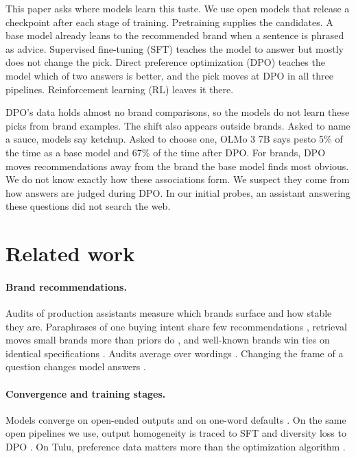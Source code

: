 \documentclass[11pt]{article}
\begin{document}
This paper asks where models learn this taste. We use open models that release a checkpoint after each stage of
training. Pretraining supplies the candidates. A base model already leans to the recommended brand when a sentence is
phrased as advice. Supervised fine-tuning (SFT) teaches the model to answer but mostly does not change the pick. Direct
preference optimization (DPO) teaches the model which of two answers is better, and the pick moves at DPO in all
three pipelines. Reinforcement learning (RL) leaves it there.

DPO's data holds almost no brand comparisons, so the models do not learn these picks from brand examples. The shift
also appears outside brands. Asked to name a sauce, models say ketchup. Asked to choose one, OLMo 3 7B says pesto 5\%
of the time as a base model and 67\% of the time after DPO. For brands, DPO moves recommendations away from the brand
the base model finds most obvious. We do not know exactly how these associations form. We suspect they come from how
answers are judged during DPO. In our initial probes, an assistant answering these questions did not search the web.

\section{Related work}
\label{sec:related}

\paragraph{Brand recommendations.} Audits of production assistants measure which brands surface and how stable they
are. Paraphrases of one buying intent share few recommendations \citep{jack2026paraphrase}, retrieval moves small brands
more than priors do \citep{tannenbaum2026stage}, and well-known brands win ties on identical specifications
\citep{chu2026brands}. Audits average over wordings \citep{zatuchin2026dice}. Changing the frame of a question changes
model answers \citep{trhlik2026multitudes,rabbani2026fact,tonneau2026cues}.

\paragraph{Convergence and training stages.} Models converge on open-ended outputs \citep{jiang2025hivemind} and on
one-word defaults \citep{parikh2026census}. On the same open pipelines we use, output homogeneity is traced to SFT
\citep{fortier2026convergence} and diversity loss to DPO \citep{karouzos2026where}. On Tulu, preference data matters more
than the optimization algorithm \citep{ivison2024unpacking}.
\end{document}
